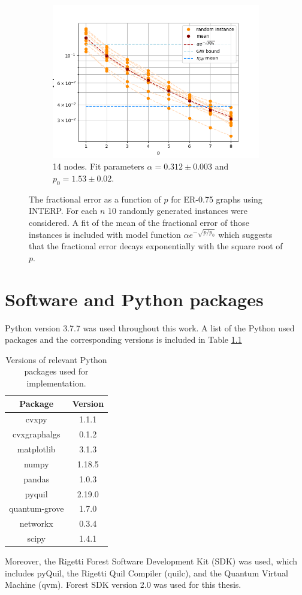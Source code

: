 \begin{figure}[H]
\begin{subfigure}[t]{0.45\textwidth}
		\includegraphics[width=\textwidth]{figures/interp/fom_er075_n15}
		\caption{14 nodes. Fit parameters $\alpha = 0.312 \pm 0.003$ and $p_0 = 1.53 \pm 0.02$.}
	\end{subfigure}
	\caption{The fractional error as a function of $p$ for ER-0.75 graphs using INTERP. For each $n$ 10 randomly generated instances were considered. A fit of the mean of the fractional error of those instances is included with model function $\alpha e^{-\sqrt{p/p_0}}$ which suggests that the fractional error decays exponentially with the square root of $p$. }
\end{figure}

\chapter{Software and Python packages}
\label{appendix:packages}

Python version 3.7.7 was used throughout this work. A list of the Python used packages and the corresponding versions is included in Table \ref{table:packages} 
\begin{table}[h!]
	\centering
	\begin{tabular}{||c  c||} 
		\hline
		Package & Version \\ [0.5ex] 
		\hline\hline
		cvxpy & 1.1.1 \\
		cvxgraphalgs & 0.1.2 \\
		matplotlib & 3.1.3 \\ 
		numpy & 1.18.5 \\
		pandas & 1.0.3 \\
		pyquil & 2.19.0 \\
		quantum-grove & 1.7.0 \\
		networkx & 0.3.4 \\
		scipy & 1.4.1 \\ [1ex] 
		\hline
	\end{tabular}
	\caption{Versions of relevant Python packages used for implementation.}
	\label{table:packages}
\end{table}

Moreover, the Rigetti Forest Software Development Kit (SDK) was used, which includes pyQuil, the Rigetti Quil Compiler (quilc), and the Quantum Virtual Machine (qvm). Forest SDK version 2.0 was used for this thesis.
